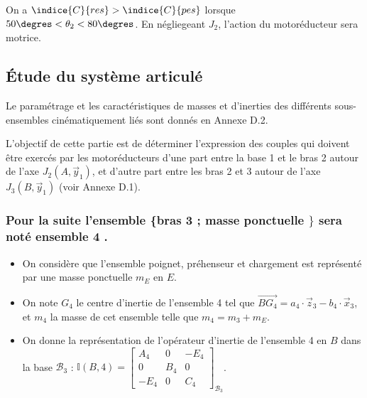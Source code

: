 \fi

\ifprof
\begin{corrige}
On a $\indice{C}{res}>\indice{C}{pes}$ lorsque $50\degres<\theta_2<80\degres$. En négliegeant $J_2$, l'action du motoréducteur sera motrice. 
\end{corrige}
\else
\fi
\subsection{Étude du système articulé}
\ifprof
\else

Le paramétrage et les caractéristiques de masses et d'inerties des différents sous-ensembles cinématiquement liés sont donnés en Annexe D.2.

L'objectif de cette partie est de déterminer l'expression des couples qui doivent être exercés par les motoréducteurs d'une part entre la base 1 et le bras 2 autour de l'axe $J_{2}\left(A, \vec{y}_{1}\right)$, et d'autre part entre les bras 2 et 3 autour de l'axe $J_{3}\left(B, \vec{y}_{1}\right)$ (voir Annexe D.1).
\fi

\subsubsection*{Pour la suite l'ensemble \{bras 3 ; masse ponctuelle $\}$ sera noté ensemble 4 .}
\ifprof
\else
\begin{itemize}
  \item On considère que l'ensemble poignet, préhenseur et chargement est représenté par une masse ponctuelle $m_{E}$ en $E$.

  \item On note $G_{4}$ le centre d'inertie de l'ensemble 4 tel que $\overrightarrow{B G_{4}}=a_{4} \cdot \vec{z}_{3}-b_{4} \cdot \vec{x}_{3}$, et $m_{4}$ la masse de cet ensemble telle que $m_{4}=m_{3}+m_{E}$.

  \item On donne la représentation de l'opérateur d'inertie de l'ensemble 4 en $B$ dans la base $\mathcal{B}_{3}$ :
$
\mathbb{I}(B, 4)=\left[\begin{array}{ccc}
A_{4} & 0 & -E_{4} \\
0 & B_{4} & 0 \\
-E_{4} & 0 & C_{4}
\end{array}\right]_{\mathcal{B}_{3}}
$.
\end{itemize}
\fi

